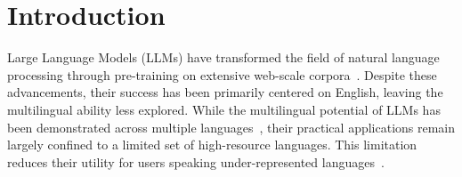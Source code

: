 \section{Introduction}


Large Language Models (LLMs) have transformed the field of natural language processing through pre-training on extensive web-scale corpora~\citep{gpt3, geminiteam2024geminifamilyhighlycapable}. Despite these advancements, their success has been primarily centered on English, leaving the multilingual ability less explored. While the multilingual potential of LLMs has been demonstrated across multiple languages~\citep{shi2023language}, their practical applications remain largely confined to a limited set of high-resource languages. This limitation reduces their utility for users speaking under-represented languages~\citep{ahia-etal-2023-languages}.

